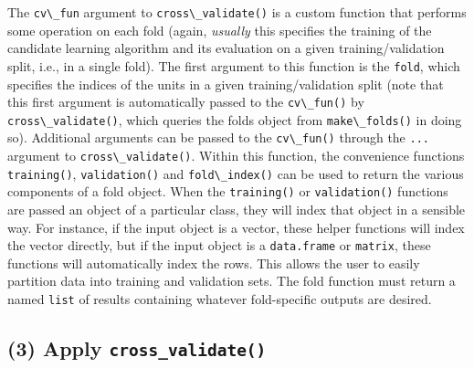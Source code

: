 \documentclass[
  12pt, krantz2,
]{krantz}
\newcommand{\passthrough}[1]{#1}
\newcommand{\1}{\mathbbm{1}}
\theoremstyle{definition}
\theoremstyle{definition}
\theoremstyle{definition}
\theoremstyle{definition}
\theoremstyle{remark}
\begin{document}
The \passthrough{\lstinline!cv\_fun!} argument to \passthrough{\lstinline!cross\_validate()!} is a custom function that performs
some operation on each fold (again, \emph{usually} this specifies the training of the
candidate learning algorithm and its evaluation on a given training/validation
split, i.e., in a single fold). The first argument to this function is the
\passthrough{\lstinline!fold!}, which specifies the indices of the units in a given training/validation
split (note that this first argument is automatically passed to the \passthrough{\lstinline!cv\_fun()!}
by \passthrough{\lstinline!cross\_validate()!}, which queries the folds object from \passthrough{\lstinline!make\_folds()!} in
doing so). Additional arguments can be passed to the \passthrough{\lstinline!cv\_fun()!} through the
\passthrough{\lstinline!...!} argument to \passthrough{\lstinline!cross\_validate()!}. Within this function, the convenience
functions \passthrough{\lstinline!training()!}, \passthrough{\lstinline!validation()!} and \passthrough{\lstinline!fold\_index()!} can be used to return
the various components of a fold object. When the \passthrough{\lstinline!training()!} or
\passthrough{\lstinline!validation()!} functions are passed an object of a particular class, they will
index that object in a sensible way. For instance, if the input object is a
vector, these helper functions will index the vector directly, but if the input
object is a \passthrough{\lstinline!data.frame!} or \passthrough{\lstinline!matrix!}, these functions will automatically index
the rows. This allows the user to easily partition data into training and
validation sets. The fold function must return a named \passthrough{\lstinline!list!} of results
containing whatever fold-specific outputs are desired.

\hypertarget{apply-cross_validate}{%
\subsection{\texorpdfstring{(3) Apply \texttt{cross\_validate()}}{(3) Apply cross\_validate()}}\label{apply-cross_validate}}
\end{document}

